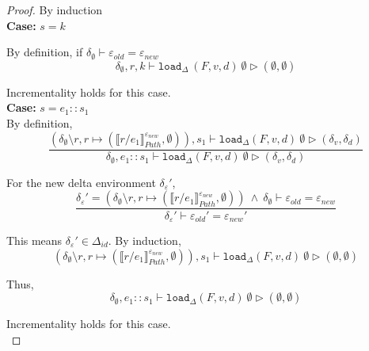 \documentclass[10pt,twoside,a4paper]{article}
\theoremstyle{theorem}
\theoremstyle{lemma}
\theoremstyle{property}
\theoremstyle{definition}
\theoremstyle{assumption}
\begin{document}
\begin{proof}
	By induction\\

	\textbf{Case: } $s = k$
		
		By definition, if $\delta_{\emptyset} \vdash \varepsilon_{old} = \varepsilon_{new}$
		\begin{displaymath}
			\delta_{\emptyset}, r, k \vdash \mathtt{load}_\Delta~ (F,v,d)~ \emptyset \rhd (\emptyset, \emptyset)
		\end{displaymath}

		Incrementality holds for this case.\\

	\textbf{Case: } $s = e_1::s_1$\\
	
		By definition,
		\begin{displaymath}
		\frac
		{(\delta_{\emptyset} \setminus r, r \mapsto (\llbracket r/e_1 \rrbracket^{\varepsilon_{new}}_{Path}, \emptyset)) , s_1 \vdash \mathtt{load}_\Delta (F,v,d)~ \emptyset \rhd (\delta_v,\delta_d)}
		{\delta_{\emptyset}, e_1::s_1 \vdash \mathtt{load}_\Delta (F,v,d)~ \emptyset \rhd (\delta_v,\delta_d)}
		\end{displaymath}

		For the new delta environment $\delta_\varepsilon'$,
		\begin{displaymath}
		\frac{
			\delta_\varepsilon' = (\delta_{\emptyset} \setminus r, r \mapsto (\llbracket r/e_1 \rrbracket^{\varepsilon_{new}}_{Path}, \emptyset)) 
			~\wedge~ \delta_{\emptyset} \vdash \varepsilon_{old} = \varepsilon_{new}
		}
		{	\delta_\varepsilon' \vdash \varepsilon_{old}' = \varepsilon_{new}' }
		\end{displaymath}

		This means $\delta_\varepsilon' \in \Delta_{id}$. By induction,
		\begin{displaymath}
		(\delta_{\emptyset} \setminus r, r \mapsto (\llbracket r/e_1 \rrbracket^{\varepsilon_{new}}_{Path}, \emptyset)) , s_1 \vdash \mathtt{load}_\Delta (F,v,d)~ \emptyset \rhd (\emptyset,\emptyset)
		\end{displaymath}

		Thus, 
		\begin{displaymath}
		\delta_{\emptyset}, e_1::s_1 \vdash \mathtt{load}_\Delta (F,v,d)~ \emptyset \rhd (\emptyset,\emptyset)
		\end{displaymath}
		
		Incrementality holds for this case.\\


\end{proof}
\end{document}
